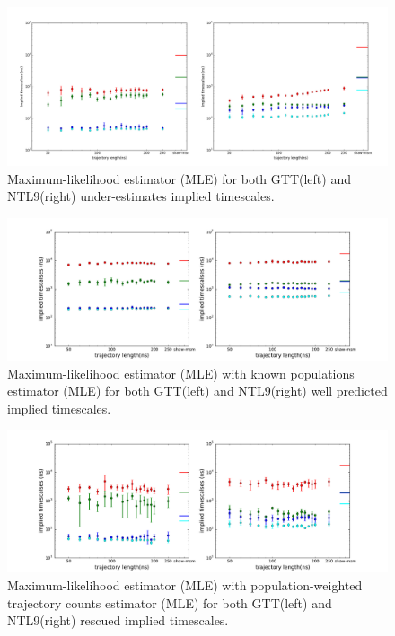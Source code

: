 \documentclass[%
 aip,
rsi,%
 amsmath,amssymb,
 reprint,%
]{revtex4-1}
\begin{document}
\begin{figure}
\includegraphics[width=0.8\paperwidth]{figures/NTL9_GTT/MLE_5trajs.pdf}%
\caption{Maximum-likelihood estimator (MLE) for both GTT(left) and NTL9(right) under-estimates implied timescales.}
\end{figure}

\begin{figure}
\includegraphics[width=0.8\paperwidth]{figures/NTL9_GTT/known_pop_5trajs.pdf}%
\caption{Maximum-likelihood estimator (MLE) with known populations estimator (MLE) for both GTT(left) and NTL9(right) well predicted implied timescales.}
\end{figure}

\begin{figure}
\includegraphics[width=0.8\paperwidth]{figures/NTL9_GTT/pop_reweighting_5trajs.pdf}%
\caption{Maximum-likelihood estimator (MLE) with population-weighted trajectory counts estimator (MLE) for both GTT(left) and NTL9(right) rescued implied timescales.}
\end{figure}
\end{document}
